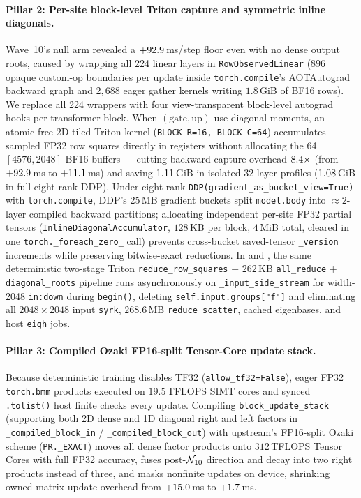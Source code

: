 \paragraph{Pillar 2: Per-site block-level Triton capture and symmetric inline diagonals.}
Wave~10's null arm revealed a $+92.9$\,ms/step floor even with no
dense output roots, caused by wrapping all 224 linear layers in
\texttt{RowObservedLinear} ($896$ opaque custom-op boundaries per update inside
\texttt{torch.compile}'s AOTAutograd backward graph and $2{,}688$ eager gather
kernels writing $1.8$\,GiB of BF16 rows). We replace all 224 wrappers with four
view-transparent block-level autograd hooks per transformer block. When
$(\text{gate},\text{up})$ use diagonal moments, an atomic-free 2D-tiled Triton
kernel (\texttt{BLOCK\_R=16, BLOCK\_C=64}) accumulates sampled FP32 row squares
directly in registers without allocating the 64 $[4576, 2048]$ BF16 buffers ---
cutting backward capture overhead $8.4\times$ (from
$+92.9$\,ms to $+11.1$\,ms) and saving
$1.11$\,GiB in isolated 32-layer profiles ($1.08$\,GiB
in full eight-rank DDP). Under eight-rank \texttt{DDP(gradient\_as\_bucket\_view=True)}
with \texttt{torch.compile}, DDP's 25\,MB gradient buckets split \texttt{model.body}
into $\approx 2$-layer compiled backward partitions; allocating independent
per-site FP32 partial tensors (\texttt{InlineDiagonalAccumulator}, $128$\,KB per
block, $4$\,MiB total, cleared in one \texttt{torch.\_foreach\_zero\_} call)
prevents cross-bucket saved-tensor \texttt{\_version} increments while
preserving bitwise-exact reductions. In  and ,
the same deterministic two-stage Triton \texttt{reduce\_row\_squares} +
$262$\,KB \texttt{all\_reduce} + \texttt{diagonal\_roots} pipeline runs
asynchronously on \texttt{\_input\_side\_stream} for width-2048 \texttt{in:down}
during \texttt{begin()}, deleting \texttt{self.input.groups["f"]} and
eliminating all $2048\times 2048$ input \texttt{syrk}, $268.6$\,MB
\texttt{reduce\_scatter}, cached eigenbases, and host \texttt{eigh} jobs.

\paragraph{Pillar 3: Compiled Ozaki FP16-split Tensor-Core update stack.}
Because deterministic training disables TF32 (\texttt{allow\_tf32=False}),
eager FP32 \texttt{torch.bmm} products executed on $19.5$\,TFLOPS SIMT cores and
synced \texttt{.tolist()} host finite checks every update. Compiling
\texttt{block\_update\_stack} (supporting both 2D dense and 1D diagonal right
and left factors in \texttt{\_compiled\_block\_in} / \texttt{\_compiled\_block\_out})
with upstream's FP16-split Ozaki scheme (\texttt{PR.\_EXACT}) moves all dense
factor products onto $312$\,TFLOPS Tensor Cores with full FP32 accuracy, fuses
post-$\mathcal{N}_{10}$ direction and decay into two right products instead of three, and
masks nonfinite updates on device, shrinking owned-matrix update overhead from
$+15.0$\,ms to $+1.7$\,ms.

